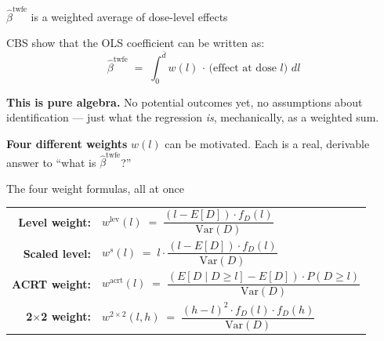 \documentclass[aspectratio=169,12pt,t]{beamer}
\begin{document}
\begin{frame}{$\widehat\beta^{\text{twfe}}$ is a weighted average of dose-level effects}
\vspace{0.2cm}

CBS show that the OLS coefficient can be written as:
\[
\widehat\beta^{\text{twfe}} \;=\; \int_0^{\bar d} w(l)\,\cdot\,\big(\text{effect at dose } l\big)\,\,dl
\]

\vspace{0.4cm}

\textbf{This is pure algebra.} \;No potential outcomes yet, no assumptions about identification --- just what the regression \textit{is}, mechanically, as a weighted sum.

\vspace{0.4cm}

\textbf{Four different weights} $w(l)$ can be motivated. \;Each is a real, derivable answer to ``what is $\widehat\beta^{\text{twfe}}$?''

\vspace{0.3em}
\end{frame}

\begin{frame}{The four weight formulas, all at once}
\vspace{0.15cm}
\small
\begin{center}
\begin{tabular}{rl}
\textbf{Level weight:} &
$w^{\text{lev}}(l) \;=\; \dfrac{(l - E[D]) \cdot f_D(l)}{\text{Var}(D)}$ \\[0.7em]
\textbf{Scaled level:} &
$w^{s}(l) \;=\; l \cdot \dfrac{(l - E[D]) \cdot f_D(l)}{\text{Var}(D)}$ \\[0.7em]
\textbf{ACRT weight:} &
$w^{\text{acrt}}(l) \;=\; \dfrac{(E[D \mid D \geq l] - E[D]) \cdot P(D \geq l)}{\text{Var}(D)}$ \\[0.7em]
\textbf{2$\times$2 weight:} &
$w^{2\times 2}(l, h) \;=\; \dfrac{(h - l)^2 \cdot f_D(l) \cdot f_D(h)}{\text{Var}(D)}$ \\
\end{tabular}
\end{center}

\vspace{0.3cm}
\normalsize
{}
\end{frame}
\end{document}
